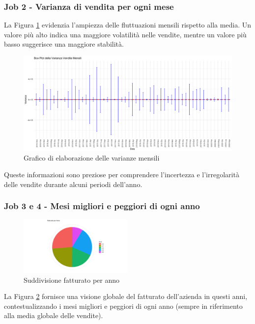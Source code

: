 \subsubsection{Job 2 - Varianza di vendita per ogni mese}
La Figura \ref{figure:varianze} evidenzia l'ampiezza delle fluttuazioni mensili rispetto alla media. Un valore più alto indica una maggiore volatilità nelle vendite, mentre un valore più basso suggerisce una maggiore stabilità.
\begin{figure}[H]
    \centering
    \includegraphics[scale=.3]{img/varianza.png}
    \caption{Grafico di elaborazione delle varianze mensili}
    \label{figure:varianze}
\end{figure}
Queste informazioni sono preziose per comprendere l'incertezza e l'irregolarità delle vendite durante alcuni periodi dell'anno.
\subsubsection{Job 3 e 4 - Mesi migliori e peggiori di ogni anno}
\begin{figure}
    \centering
    \includegraphics[width=0.5\textwidth]{img/fatturato per anno.png}
    \caption{Suddivisione fatturato per anno}
    \label{figure:fatturatoAnno}
\end{figure}

La Figura \ref{figure:fatturatoAnno} fornisce una visione globale del fatturato dell'azienda in questi anni, contestualizzando i mesi migliori e peggiori di ogni anno (sempre in riferimento alla media globale delle vendite).


